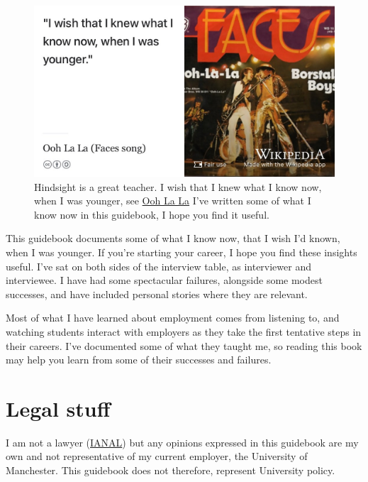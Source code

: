 \documentclass[
]{book}
\begin{document}
\begin{figure}

{\centering \includegraphics[width=0.99\linewidth]{images/faces} 

}

\caption{Hindsight is a great teacher. I wish that I knew what I know now, when I was younger, see \href{https://en.wikipedia.org/wiki/Ooh_La_La_(Faces_song)}{Ooh La La} \citep{faces} I've written some of what I know now in this guidebook, I hope you find it useful.}\label{fig:faces-fig}
\end{figure}



This guidebook documents some of what I know now, that I wish I'd known, when I was younger. If you're starting your career, I hope you find these insights useful. I've sat on both sides of the interview table, as interviewer and interviewee. I have had some spectacular failures, alongside some modest successes, and have included personal stories where they are relevant.

Most of what I have learned about employment comes from listening to, and watching students interact with employers as they take the first tentative steps in their careers. I've documented some of what they taught me, so reading this book may help you learn from some of their successes and failures.

\hypertarget{legal}{%
\section{Legal stuff}\label{legal}}

I am not a lawyer (\href{https://en.wikipedia.org/wiki/IANAL}{IANAL}) but any opinions expressed in this guidebook are my own and not representative of my current employer, the University of Manchester. This guidebook does not therefore, represent University policy.
\end{document}
